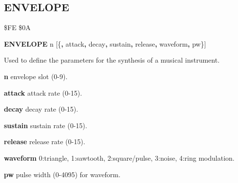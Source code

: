 
\newpage
\subsection{ENVELOPE}
\begin{description}[leftmargin=2cm,style=nextline]
\item [Token:] \$FE \$0A
\item [Format:] {\bf ENVELOPE} n [\{{\bf,} attack{\bf,} decay{\bf,}
		sustain{\bf,} release{\bf,} waveform{\bf,} pw\}]
\item [Usage:] Used to define
               the parameters for the synthesis of a musical
               instrument.

      {\bf n} envelope slot (0-9).

      {\bf attack} attack rate (0-15).

      {\bf decay} decay rate (0-15).

      {\bf sustain} sustain rate (0-15).

      {\bf release} release rate (0-15).

      {\bf waveform} 0:triangle, 1:sawtooth, 2:square/pulse, 3:noise, 4:ring modulation.

      {\bf pw} pulse width (0-4095) for waveform.


\end{description}
